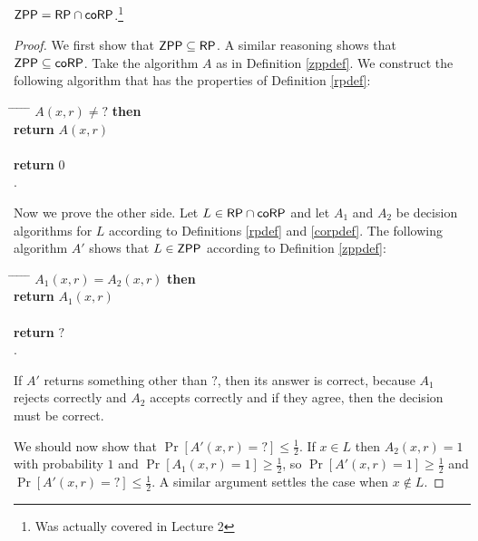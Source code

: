 \begin{proposition} $\mathsf{ZPP} = \mathsf{RP} \cap \mathsf{coRP}$.\footnote{Was actually covered in Lecture 2}
\end{proposition}
\begin{proof}
We first show that $\mathsf{ZPP} \subseteq \mathsf{RP}$. A similar reasoning shows that $\mathsf{ZPP} \subseteq \mathsf{coRP}$. Take the algorithm $A$ as in Definition \ref{zppdef}. We construct the following algorithm that has the properties of Definition \ref{rpdef}:

\begin{tabbing}
\hspace*{.25in} \= \hspace*{.25in} \= \hspace*{.25in} \= \hspace*{.25in} \= \hspace*{.25in} \=\kill
{} $A(x, r) \neq ?$ {\bf then } \\
\>\> {\bf return} $A(x, r)$ \\
 \\
\>\> {\bf return} $0$\\
 .
\end{tabbing}

Now we prove the other side. Let $L \in \mathsf{RP} \cap \mathsf{coRP}$ and let $A_1$ and $A_2$ be decision algorithms for $L$ according to Definitions \ref{rpdef} and \ref{corpdef}. The following algorithm $A'$ shows that $L \in \mathsf{ZPP}$ according to Definition \ref{zppdef}:

\begin{tabbing}
\hspace*{.25in} \= \hspace*{.25in} \= \hspace*{.25in} \= \hspace*{.25in} \= \hspace*{.25in} \=\kill
{} $A_1(x, r) = A_2(x, r)$ {\bf then } \\
\>\> {\bf return} $A_1(x, r)$ \\
 \\
\>\> {\bf return} $?$\\
 .
\end{tabbing}

If $A'$ returns something other than $?$, then its answer is correct, because $A_1$ rejects correctly and $A_2$ accepts correctly and if they agree, then the decision must be correct.

We should now show that $\Pr[A'(x, r) = ?] \leq \frac{1}{2}$. If $x \in L$ then $A_2(x, r) = 1$ with probability $1$ and $\Pr[A_1(x, r) = 1] \geq \frac{1}{2}$, so $\Pr[A'(x, r) = 1] \geq \frac{1}{2}$ and $\Pr[A'(x, r) = ?] \leq \frac{1}{2}$. A similar argument settles the case when $x \not \in L$. 

\end{proof}

